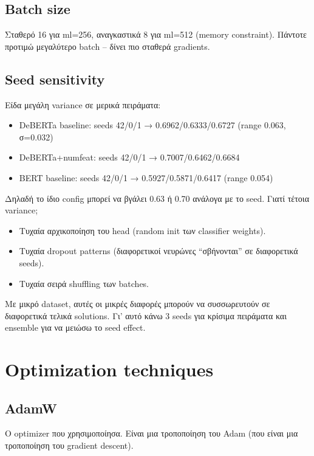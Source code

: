 \documentclass[12pt]{fphw}
\begin{document}
\subsection{Batch size}

Σταθερό 16 για ml=256, αναγκαστικά 8 για ml=512 (memory constraint). Πάντοτε προτιμώ μεγαλύτερο batch -- δίνει πιο σταθερά gradients.

\subsection{Seed sensitivity}

Είδα μεγάλη variance σε μερικά πειράματα:

\begin{itemize}
    \item DeBERTa baseline: seeds 42/0/1 → 0.6962/0.6333/0.6727 (range 0.063, σ=0.032)
    \item DeBERTa+numfeat: seeds 42/0/1 → 0.7007/0.6462/0.6684
    \item BERT baseline: seeds 42/0/1 → 0.5927/0.5871/0.6417 (range 0.054)
\end{itemize}

Δηλαδή το ίδιο config μπορεί να βγάλει 0.63 ή 0.70 ανάλογα με το seed. Γιατί τέτοια variance;

\begin{itemize}
    \item Τυχαία αρχικοποίηση του head (random init των classifier weights).
    \item Τυχαία dropout patterns (διαφορετικοί νευρώνες ``σβήνονται'' σε διαφορετικά seeds).
    \item Τυχαία σειρά shuffling των batches.
\end{itemize}

Με μικρό dataset, αυτές οι μικρές διαφορές μπορούν να συσσωρευτούν σε διαφορετικά τελικά solutions. Γι' αυτό κάνω 3 seeds για κρίσιμα πειράματα και ensemble για να μειώσω το seed effect.

\section{Optimization techniques}

\subsection{AdamW \cite{loshchilov2019adamw}}

Ο optimizer που χρησιμοποίησα. Είναι μια τροποποίηση του Adam (που είναι μια τροποποίηση του gradient descent).
\end{document}
